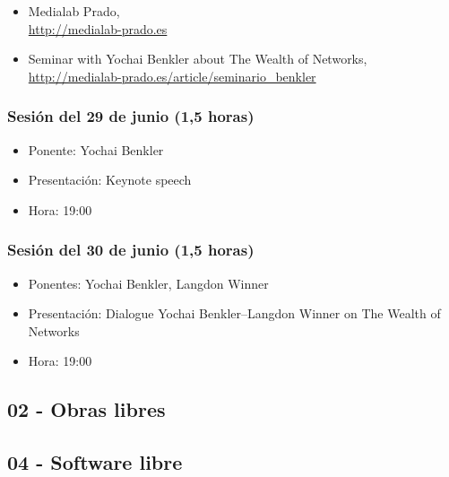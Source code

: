 \documentclass[a4paper,12pt]{article}
\begin{document}
\begin{itemize}
\item Medialab Prado, \\
  \url{http://medialab-prado.es}
\item Seminar with Yochai Benkler about The Wealth of Networks, \\
  \url{http://medialab-prado.es/article/seminario_benkler}
\end{itemize}

\subsubsection{Sesión del 29 de junio (1,5 horas)}

\begin{itemize}
\item Ponente: Yochai Benkler
\item Presentación: Keynote speech
\item Hora: 19:00
\end{itemize}

\subsubsection{Sesión del 30 de junio (1,5 horas)}

\begin{itemize}
\item Ponentes: Yochai Benkler, Langdon Winner
\item Presentación: Dialogue Yochai Benkler--Langdon Winner on The Wealth of Networks
\item Hora: 19:00
\end{itemize}

\subsection{02 - Obras libres}


\subsection{04 - Software libre}
\end{document}
